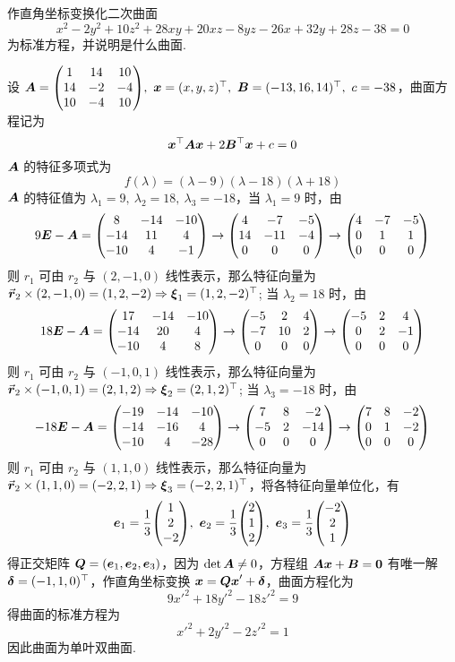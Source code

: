 \begin{example}
    作直角坐标变换化二次曲面 $$x^2-2y^2+10z^2+28xy+20xz-8yz-26x+32y+28z-38=0$$
    为标准方程，并说明是什么曲面.
\end{example}
\begin{solution}
    设 $\vb*{A}=\mqty(1&14&10\\14&-2&-4\\10&-4&10),~\vb*{x}=(x,y,z)^\top,~\vb*{B}=(-13,16,14)^\top,~c=-38$，曲面方程记为 $$\vb*{x}^\top\vb*{Ax}+2\vb*{B}^\top\vb*{x}+c=0$$
    $\vb*{A}$ 的特征多项式为 $$f(\lambda)=(\lambda-9)(\lambda-18)(\lambda+18)$$
    $\vb*{A}$ 的特征值为 $\lambda_1=9,~\lambda_2=18,~\lambda_3=-18$，当 $\lambda_1=9$ 时，由 $$9\vb*{E}-\vb*{A}=\mqty(8&-14&-10\\-14&11&4\\-10&4&-1)\to\mqty(4&-7&-5\\14&-11&-4\\0&0&0)\to\mqty(4&-7&-5\\0&1&1\\0&0&0)$$
    则 $r_1$ 可由 $r_2$ 与 $(2,-1,0)$ 线性表示，那么特征向量为 $\va*{r}_2\times(2,-1,0)=(1,2,-2)\Rightarrow \vb*{\xi}_1=(1,2,-2)^\top$; 当 $\lambda_2=18$ 时，由
    $$18\vb*{E}-\vb*{A}=\mqty(17&-14&-10\\-14&20&4\\-10&4&8)\to\mqty(-5&2&4\\-7&10&2\\0&0&0)\to\mqty(-5&2&4\\0&2&-1\\0&0&0)$$
    则 $r_1$ 可由 $r_2$ 与 $(-1,0,1)$ 线性表示，那么特征向量为 $\va*{r}_2\times(-1,0,1)=(2,1,2)\Rightarrow\vb*{\xi}_2=(2,1,2)^\top$; 当 $\lambda_3=-18$ 时，由
    $$-18\vb*{E}-\vb*{A}=\mqty(-19&-14&-10\\-14&-16&4\\-10&4&-28)\to\mqty(7&8&-2\\-5&2&-14\\0&0&0)\to\mqty(7&8&-2\\0&1&-2\\0&0&0)$$
    则 $r_1$ 可由 $r_2$ 与 $(1,1,0)$ 线性表示，那么特征向量为 $\va*{r}_2\times(1,1,0)=(-2,2,1)\Rightarrow \vb*{\xi}_3=(-2,2,1)^\top$，将各特征向量单位化，有
    $$\vb*{e}_1=\dfrac{1}{3}\mqty(1\\2\\-2),~\vb*{e}_2=\dfrac{1}{3}\mqty(2\\1\\2),~\vb*{e}_3=\dfrac{1}{3}\mqty(-2\\2\\1)$$
    得正交矩阵 $\vb*{Q}=(\vb*{e}_1,\vb*{e}_2,\vb*{e}_3)$，因为 $\det\vb*{A}\neq0$，方程组 $\vb*{Ax}+\vb*{B}=\vb*{0}$ 有唯一解 $\vb*{\delta}=(-1,1,0)^\top$，作直角坐标变换 $\vb*{x}=\vb*{Qx}'+\vb*{\delta}$，曲面方程化为
    $$9x'^2+18y'^2-18z'^2=9$$
    得曲面的标准方程为 $$x'^2+2y'^2-2z'^2=1$$
    因此曲面为单叶双曲面.
\end{solution}

